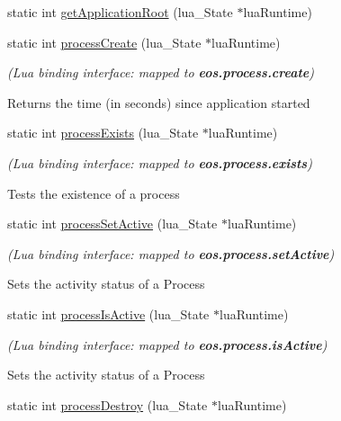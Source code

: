 \begin{CompactItemize}
static int \hyperlink{structEOSKernel_d1ccb01e71a53c8219f0d1a8a2fa87d1}{getApplicationRoot} (lua\_\-State $\ast$luaRuntime)
\item 
static int \hyperlink{structEOSKernel_e22b7cc7c59c6a3f40bbe3f45009b6f7}{processCreate} (lua\_\-State $\ast$luaRuntime)
\begin{CompactList}\small\item\em {\em (Lua binding interface: mapped to {\bf eos.process.create})\/}\par
\par
 Returns the time (in seconds) since application started \item\end{CompactList}\item 
static int \hyperlink{structEOSKernel_cd45fae422857bc7341451ff8b63f0aa}{processExists} (lua\_\-State $\ast$luaRuntime)
\begin{CompactList}\small\item\em {\em (Lua binding interface: mapped to {\bf eos.process.exists})\/}\par
\par
 Tests the existence of a process \item\end{CompactList}\item 
static int \hyperlink{structEOSKernel_4def28b41973ca584e9a701dc77493bc}{processSetActive} (lua\_\-State $\ast$luaRuntime)
\begin{CompactList}\small\item\em {\em (Lua binding interface: mapped to {\bf eos.process.setActive})\/}\par
\par
 Sets the activity status of a Process \item\end{CompactList}\item 
static int \hyperlink{structEOSKernel_0cc83428fafd6edbde079be3d40ab9b5}{processIsActive} (lua\_\-State $\ast$luaRuntime)
\begin{CompactList}\small\item\em {\em (Lua binding interface: mapped to {\bf eos.process.isActive})\/}\par
\par
 Sets the activity status of a Process \item\end{CompactList}\item 
static int \hyperlink{structEOSKernel_540af533e83f0920b55b4ad638a76ab5}{processDestroy} (lua\_\-State $\ast$luaRuntime)

\end{CompactItemize}
